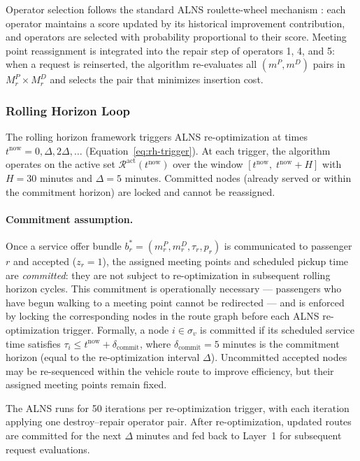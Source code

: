 Operator selection follows the standard ALNS roulette-wheel mechanism
\citep{ropke2006}: each operator maintains a score updated by its historical improvement
contribution, and operators are selected with probability proportional to their score.
Meeting point reassignment is integrated into the repair step of operators 1, 4, and 5:
when a request is reinserted, the algorithm re-evaluates all $(m^P, m^D)$ pairs in
$M_r^P \times M_r^D$ and selects the pair that minimizes insertion cost.

\subsubsection{Rolling Horizon Loop}

The rolling horizon framework \citep{bent2004} triggers ALNS re-optimization at times
$t^{\text{now}} = 0, \Delta, 2\Delta, \ldots$ (Equation~\ref{eq:rh-trigger}). At each
trigger, the algorithm operates on the active set
$\mathcal{R}^{\text{act}}(t^{\text{now}})$ over the window
$[t^{\text{now}},\; t^{\text{now}} + H]$ with $H = 30$ minutes and $\Delta = 5$ minutes.
Committed nodes (already served or within the commitment horizon) are locked and cannot
be reassigned.

\paragraph{Commitment assumption.}
Once a service offer bundle $b_r^* = (m_r^P, m_r^D, \tau_r, p_r)$ is communicated to
passenger $r$ and accepted ($z_r = 1$), the assigned meeting points and scheduled pickup
time are \emph{committed}: they are not subject to re-optimization in subsequent rolling
horizon cycles. This commitment is operationally necessary --- passengers who have begun
walking to a meeting point cannot be redirected --- and is enforced by locking the
corresponding nodes in the route graph before each ALNS re-optimization trigger.
Formally, a node $i \in \sigma_v$ is committed if its scheduled service time satisfies
$\tau_i \leq t^{\text{now}} + \delta_{\text{commit}}$, where $\delta_{\text{commit}} = 5$
minutes is the commitment horizon (equal to the re-optimization interval $\Delta$).
Uncommitted accepted nodes may be re-sequenced within the vehicle route to improve
efficiency, but their assigned meeting points remain fixed.

The ALNS runs for 50 iterations per re-optimization trigger, with each
iteration applying one destroy--repair operator pair. After re-optimization, updated
routes are committed for the next $\Delta$ minutes and fed back to Layer~1 for subsequent
request evaluations.

